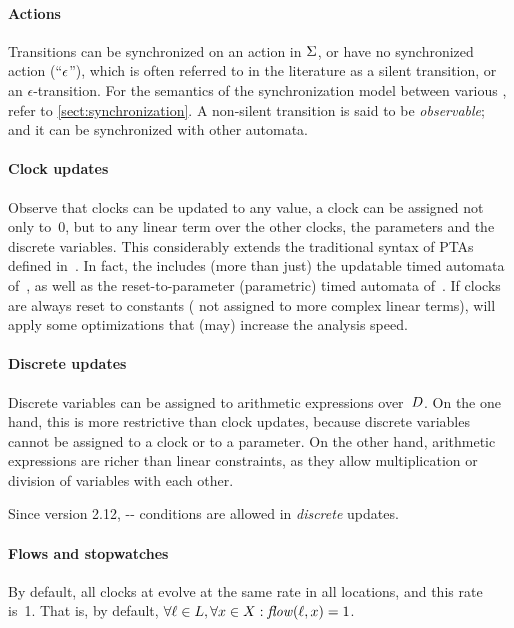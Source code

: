 \paragraph{Actions}
Transitions can be synchronized on an action in $\Sigma$, or have no synchronized action (``$\epsilon$''), which is often referred to in the literature as a silent transition, or an $\epsilon$-transition.
For the semantics of the synchronization model between various \IPTA{}, refer to \cref{sect:synchronization}.
A non-silent transition is said to be \emph{observable}; and it can be synchronized with other automata.

\paragraph{Clock updates}
Observe that clocks can be updated to any value, \ie{} a clock can be assigned not only to~0, but to any linear term over the other clocks, the parameters and the discrete variables.
This considerably extends the traditional syntax of PTAs defined in~\cite{AHV93}.
In fact, the \imitator{} includes (more than just) the updatable timed automata of~\cite{BDFP04}, as well as the reset-to-parameter (parametric) timed automata of~\cite{ALR18PresetTA}.
If clocks are always reset to constants (\ie{} not assigned to more complex linear terms), \imitator{} will apply some optimizations that (may) increase the analysis speed.

\paragraph{Discrete updates}
Discrete variables can be assigned to arithmetic expressions over~$D$.
On the one hand, this is more restrictive than clock updates, because discrete variables cannot be assigned to a clock or to a parameter.
On the other hand, arithmetic expressions are richer than linear constraints, as they allow multiplication or division of variables with each other.

Since version 2.12, -- conditions are allowed in \emph{discrete} updates.

\paragraph{Flows and stopwatches}
By default, all clocks at evolve at the same rate in all locations, and this rate is~1.
That is, by default, $\forall \ell \in L, \forall x \in X : \mathit{flow}(\ell, x) = 1$.

